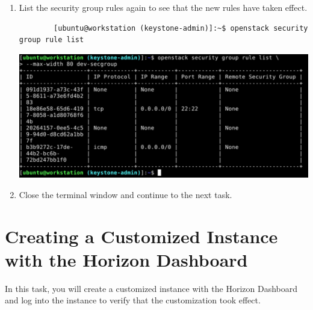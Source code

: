 \documentclass[letterpaper, 12pt]{article}
\begin{document}
\begin{enumerate}
    \item List the security group rules again to see that the new rules have taken effect.
    \begin{lstlisting}
        [ubuntu@workstation (keystone-admin)]:~$ openstack security group rule list
    \end{lstlisting}

    \begin{center}
        \includegraphics[width=\linewidth]{images/part1/step29.png}
    \end{center}

    \item Close the terminal window and continue to the next task.
\end{enumerate}

\section{Creating a Customized Instance with the Horizon Dashboard}
\label{sec:creating_a_customized_instance_using_the_horizon_dashboard}
In this task, you will create a customized instance with the Horizon Dashboard and log into the instance to verify that the customization took effect.
\end{document}
